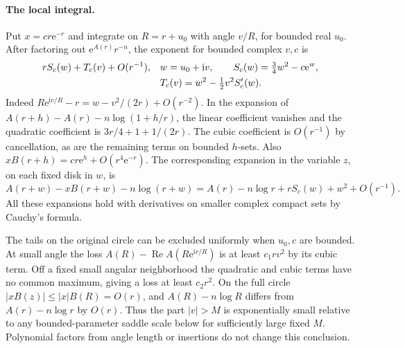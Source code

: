 \documentclass[11pt]{article}
\DeclareMathOperator{\Rea}{Re}
\newcommand{\ee}{\mathrm e}
\newcommand{\ii}{\mathrm i}
\begin{document}
\paragraph{The local integral.}
Put \(x=c r\ee^{-r}\) and integrate on \(R=r+u_0\) with angle \(v/R\), for bounded real \(u_0\). After factoring out \(\ee^{A(r)}r^{-n}\), the exponent for bounded complex \(v,c\) is
\begin{align}
 r S_c(w)+T_c(v)+O(r^{-1}),\quad &w=u_0+\ii v,\qquad
 S_c(w)=\tfrac34w^2-c\ee^w,\notag\\
 &T_c(v)=w^2-\tfrac12 v^2 S'_c(w).
 \label{eq:innerexp}
\end{align}
Indeed \(R\ee^{\ii v/R}-r=w-v^2/(2r)+O(r^{-2})\). In the expansion of \(A(r+h)-A(r)-n\log(1+h/r)\), the linear coefficient vanishes and the quadratic coefficient is \(3r/4+1+1/(2r)\). The cubic coefficient is \(O(r^{-1})\) by cancellation, as are the remaining terms on bounded \(h\)-sets. Also \(xB(r+h)=cr\ee^h+O(r^4\ee^{-r})\). The corresponding expansion in the variable \(z\), on each fixed disk in \(w\), is
\begin{equation}\label{eq:directinner}
 A(r+w)-xB(r+w)-n\log(r+w)
 =A(r)-n\log r+rS_c(w)+w^2+O(r^{-1}).
\end{equation}
All these expansions hold with derivatives on smaller complex compact sets by Cauchy's formula.

The tails on the original circle can be excluded uniformly when \(u_0,c\) are bounded. At small angle the loss \(A(R)-\Rea A(R\ee^{\ii v/R})\) is at least \(c_1 r v^2\) by its cubic term. Off a fixed small angular neighborhood the quadratic and cubic terms have no common maximum, giving a loss at least \(c_2 r^2\). On the full circle \(|xB(z)|\le |x|B(R)=O(r)\), and \(A(R)-n\log R\) differs from \(A(r)-n\log r\) by \(O(r)\). Thus the part \(|v|>M\) is exponentially small relative to any bounded-parameter saddle scale below for sufficiently large fixed \(M\). Polynomial factors from angle length or insertions do not change this conclusion.
\end{document}
